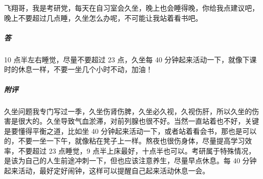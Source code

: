 \begin{case}
    飞翔哥，我是考研党，每天在自习室会久坐，晚上也会睡得晚，你给我点建议吧，晚上不要超过几点睡，久坐怎么办呢，不可能让我站着看书吧。
    \subparagraph{答} 10 点半左右睡觉，尽量不要超过 23 点，久坐每 40 分钟起来活动一下，就像下课时的休息一样，不要一坐几个小时不动，加油！
    \subparagraph{附评} 久坐问题我专门写过一季，久坐伤肾伤脾，久坐必久视，久视伤肝，所以久坐的伤害是很大的。久坐导致气血淤滞，对前列腺也很不好。当然一直站着也不好，关键是要懂得平衡之道，比如坐 40 分钟起来活动一下，或者站着看会书，那也是可以的，不要一坐一下午，就像粘在凳子上一样。熬夜也很伤身体，尽量提高学习效率，不要超过 23 点睡觉，9 点半上床最好，十点半也可以。考研属于特殊情况，是该为自己的人生前途冲刺一下，但也应该注意养生，尽量早点休息。每 40 分钟起来活动，最好定好闹钟，这样可以提醒自己起来活动休息一会。
\end{case}

